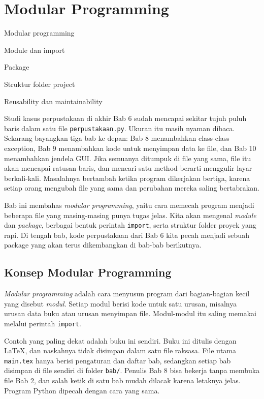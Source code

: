 \chapter{Modular Programming}

\begin{dibabini}
  \item Modular programming
  \item Module dan import
  \item Package
  \item Struktur folder project
  \item Reusability dan maintainability
\end{dibabini}

Studi kasus perpustakaan di akhir Bab 6 sudah mencapai sekitar tujuh puluh baris dalam satu file \texttt{perpustakaan.py}. Ukuran itu masih nyaman dibaca. Sekarang bayangkan tiga bab ke depan: Bab 8 menambahkan class-class exception, Bab 9 menambahkan kode untuk menyimpan data ke file, dan Bab 10 menambahkan jendela GUI. Jika semuanya ditumpuk di file yang sama, file itu akan mencapai ratusan baris, dan mencari satu method berarti menggulir layar berkali-kali. Masalahnya bertambah ketika program dikerjakan bertiga, karena setiap orang mengubah file yang sama dan perubahan mereka saling bertabrakan.

Bab ini membahas \emph{modular programming}, yaitu cara memecah program menjadi beberapa file yang masing-masing punya tugas jelas. Kita akan mengenal \emph{module} dan \emph{package}, berbagai bentuk perintah \texttt{import}, serta struktur folder proyek yang rapi. Di tengah bab, kode perpustakaan dari Bab 6 kita pecah menjadi sebuah package yang akan terus dikembangkan di bab-bab berikutnya.

\section{Konsep Modular Programming}

\emph{Modular programming} adalah cara menyusun program dari bagian-bagian kecil yang disebut \emph{modul}. Setiap modul berisi kode untuk satu urusan, misalnya urusan data buku atau urusan menyimpan file. Modul-modul itu saling memakai melalui perintah \texttt{import}.

Contoh yang paling dekat adalah buku ini sendiri. Buku ini ditulis dengan LaTeX, dan naskahnya tidak disimpan dalam satu file raksasa. File utama \texttt{main.tex} hanya berisi pengaturan dan daftar bab, sedangkan setiap bab disimpan di file sendiri di folder \texttt{bab/}. Penulis Bab 8 bisa bekerja tanpa membuka file Bab 2, dan salah ketik di satu bab mudah dilacak karena letaknya jelas. Program Python dipecah dengan cara yang sama.

